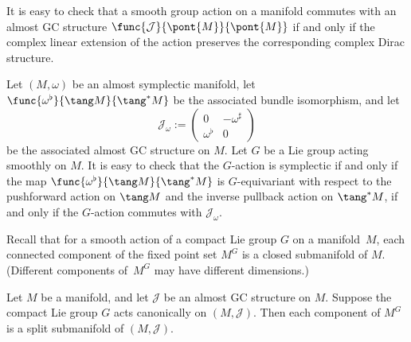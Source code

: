 It is easy to check that a smooth group action on a manifold commutes with an almost GC structure $\func{\mathcal{J}}{\pont{M}}{\pont{M}}$ if and only if the complex linear extension of the action preserves the corresponding complex Dirac structure.


\begin{Example}
Let $(M,\omega)$ be an almost symplectic manifold, let $\func{\omega^{\flat}}{\tang M}{\tang^* M}$ be the associated bundle isomorphism, and let
\[
  \mathcal{J}_{\omega} :=
  \begin{pmatrix}
    0 & - \omega^{\sharp} \\
    \omega^{\flat} & 0
  \end{pmatrix}
\]
be the associated almost GC structure on $M$.  Let $G$ be a Lie group acting smoothly on $M$.  It is easy to check that the $G$-action is symplectic if and only if the map $\func{\omega^{\flat}}{\tang M}{\tang^* M}$ is $G$-equivariant with respect to the pushforward action on $\tang M$ and the inverse pullback action on $\tang^* M$, if and only if the $G$-action commutes with $\mathcal{J}_{\omega}$.
\end{Example}


Recall that for a smooth action of a compact Lie group $G$ on a manifold~$M$, each connected component of the f\/ixed point set $M^G$ is a closed submanifold of $M$.  (Dif\/ferent components of~$M^G$ may have dif\/ferent dimensions.)


\begin{Proposition}  \label{prop9}
Let $M$ be a manifold, and let $\mathcal{J}$ be an almost GC structure on $M$. Suppose the compact Lie group $G$ acts canonically on $(M,\mathcal{J})$.  Then each component of $M^{G}$ is a split submanifold of $(M,\mathcal{J})$.
\end{Proposition}


